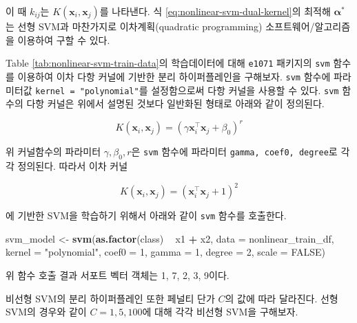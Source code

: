 \documentclass[]{book}
\newenvironment{Shaded}{\begin{snugshade}}{\end{snugshade}}
\newcommand{\DataTypeTok}[1]{\textcolor[rgb]{0.13,0.29,0.53}{#1}}
\newcommand{\DecValTok}[1]{\textcolor[rgb]{0.00,0.00,0.81}{#1}}
\newcommand{\KeywordTok}[1]{\textcolor[rgb]{0.13,0.29,0.53}{\textbf{#1}}}
\newcommand{\NormalTok}[1]{#1}
\newcommand{\OperatorTok}[1]{\textcolor[rgb]{0.81,0.36,0.00}{\textbf{#1}}}
\newcommand{\OtherTok}[1]{\textcolor[rgb]{0.56,0.35,0.01}{#1}}
\newcommand{\StringTok}[1]{\textcolor[rgb]{0.31,0.60,0.02}{#1}}
\begin{document}
이 때 \(k_{ij}\)는 \(K(\mathbf{x}_i, \mathbf{x}_j)\)를 나타낸다. 식 \eqref{eq:nonlinear-svm-dual-kernel}의 최적해 \(\boldsymbol\alpha^*\)는 선형 SVM과 마찬가지로 이차계획(quadratic programming) 소프트웨어/알고리즘을 이용하여 구할 수 있다.

Table \ref{tab:nonlinear-svm-train-data}의 학습데이터에 대해 \texttt{e1071} 패키지의 \texttt{svm} 함수를 이용하여 이차 다항 커널에 기반한 분리 하이퍼플레인을 구해보자. \texttt{svm} 함수에 파라미터값 \texttt{kernel\ =\ "polynomial"}를 설정함으로써 다항 커널을 사용할 수 있다. \texttt{svm} 함수의 다항 커널은 위에서 설명된 것보다 일반화된 형태로 아래와 같이 정의된다.

\begin{equation*}
K(\mathbf{x}_i, \mathbf{x}_j) = \left( \gamma \mathbf{x}_i^\top \mathbf{x}_j + \beta_0 \right)^r
\end{equation*}

위 커널함수의 파라미터 \(\gamma, \beta_0, r\)은 \texttt{svm} 함수에 파라미터 \texttt{gamma,\ coef0,\ degree}로 각각 정의된다. 따라서 이차 커널

\begin{equation*}
K(\mathbf{x}_i, \mathbf{x}_j) = \left( \mathbf{x}_i^\top \mathbf{x}_j + 1 \right)^2
\end{equation*}

에 기반한 SVM을 학습하기 위해서 아래와 같이 \texttt{svm} 함수를 호출한다.

\begin{Shaded}
\begin{Highlighting}[]
\NormalTok{svm_model <-}\StringTok{ }\KeywordTok{svm}\NormalTok{(}\KeywordTok{as.factor}\NormalTok{(class) }\OperatorTok{~}\StringTok{ }\NormalTok{x1 }\OperatorTok{+}\StringTok{ }\NormalTok{x2, }\DataTypeTok{data =}\NormalTok{ nonlinear_train_df, }
                 \DataTypeTok{kernel =} \StringTok{"polynomial"}\NormalTok{, }\DataTypeTok{coef0 =} \DecValTok{1}\NormalTok{, }\DataTypeTok{gamma =} \DecValTok{1}\NormalTok{, }\DataTypeTok{degree =} \DecValTok{2}\NormalTok{,}
                 \DataTypeTok{scale =} \OtherTok{FALSE}\NormalTok{)}
\end{Highlighting}
\end{Shaded}

위 함수 호출 결과 서포트 벡터 객체는 1, 7, 2, 3, 9이다.

비선형 SVM의 분리 하이퍼플레인 또한 페널티 단가 \(C\)의 값에 따라 달라진다. 선형 SVM의 경우와 같이 \(C = 1, 5, 100\)에 대해 각각 비선형 SVM을 구해보자.
\end{document}

